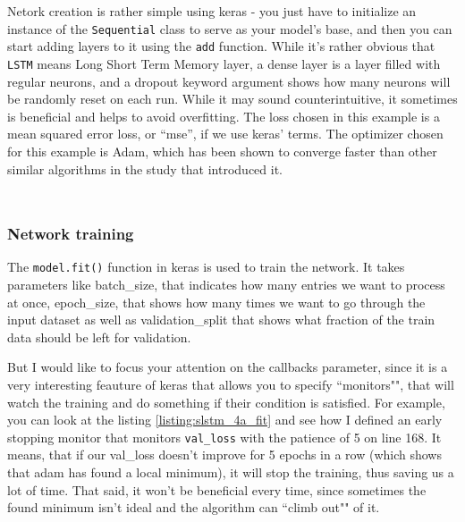\documentclass[12pt, a4paper]{article}
\begin{document}
Netork creation is rather simple using keras - you just have to initialize an instance of the \texttt{Sequential} class to serve as your model's base, and then you can start adding layers to it using the \texttt{add} function. While it's rather obvious that \texttt{LSTM} means Long Short Term Memory layer, a dense layer is a layer filled with regular neurons, and a dropout keyword argument shows how many neurons will be randomly reset on each run. While it may sound counterintuitive, it sometimes is beneficial and helps to avoid overfitting. The loss chosen in this example is a mean squared error loss, or ``mse'', if we use keras' terms. The optimizer chosen for this example is Adam, which has been shown to converge faster than other similar algorithms in the study that introduced it\cite{kingma2014adam}.

\bgroup
  \inputminted[linenos, breaklines=true, fontsize=\scriptsize, firstnumber=last]{python}{src/stocks/lstm/3a_onelayer.py}
  \label{listing:slstm_3a_onelayer}
\egroup

\bgroup
  \inputminted[linenos, breaklines=true, fontsize=\scriptsize, firstnumber=last]{python}{src/stocks/lstm/3b_twolayer.py}
  \label{listing:slstm_3b_twolayer}
\egroup

\subsubsection{Network training}

The \texttt{model.fit()} function in keras is used to train the network. It takes parameters like batch\_size, that indicates how many entries we want to process at once, epoch\_size, that shows how many times we want to go through the input dataset as well as validation\_split that shows what fraction of the train data should be left for validation.

But I would like to focus your attention on the callbacks parameter, since it is a very interesting feauture of keras that allows you to specify ``monitors"", that will watch the training and do something if their condition is satisfied. For example, you can look at the listing \ref{listing:slstm_4a_fit} and see how I defined an early stopping monitor that monitors \texttt{val\_loss} with the patience of 5 on line 168. It means, that if our val\_loss doesn't improve for 5 epochs in a row (which shows that adam has found a local minimum), it will stop the training, thus saving us a lot of time. That said, it won't be beneficial every time, since sometimes the found minimum isn't ideal and the algorithm can ``climb out"" of it.
\end{document}
